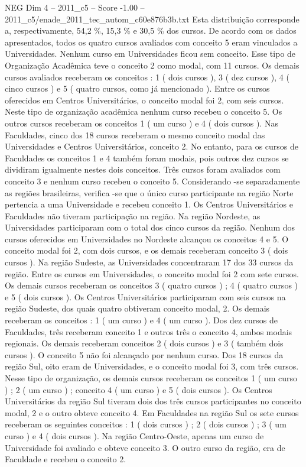 \begin{textsample}{NEG Dim 4 – 2011\_c5 – Score -1.00 – 2011\_c5/enade\_2011\_tec\_autom\_c60e876b3b.txt}
Esta distribuição corresponde a, respectivamente, 54,2 \%, 15,3 \% e 30,5 \% dos cursos.
De acordo com os dados apresentados, todos os quatro cursos avaliados com conceito 5 eram vinculados a Universidades.
Nenhum curso em Universidades ficou sem conceito.
Esse tipo de Organização Acadêmica teve o conceito 2 como modal, com 11 cursos.
Os demais cursos avaliados receberam os conceitos : 1 ( dois cursos ), 3 ( dez cursos ), 4 ( cinco cursos ) e 5 ( quatro cursos, como já mencionado ).
Entre os cursos oferecidos em Centros Universitários, o conceito modal foi 2, com seis cursos.
Neste tipo de organização acadêmica nenhum curso recebeu o conceito 5.
Os outros cursos receberam os conceitos 1 ( um curso ) e 4 ( dois cursos ).
Nas Faculdades, cinco dos 18 cursos receberam o mesmo conceito modal das Universidades e Centros Universitários, conceito 2.
No entanto, para os cursos de Faculdades os conceitos 1 e 4 também foram modais, pois outros dez cursos se dividiram igualmente nestes dois conceitos.
Três cursos foram avaliados com conceito 3 e nenhum curso recebeu o conceito 5.
Considerando -se separadamente as regiões brasileiras, verifica -se que o único curso participante na região Norte pertencia a uma Universidade e recebeu conceito 1.
Os Centros Universitários e Faculdades não tiveram participação na região.
Na região Nordeste, as Universidades participaram com o total dos cinco cursos da região.
Nenhum dos cursos oferecidos em Universidades no Nordeste alcançou os conceitos 4 e 5.
O conceito modal foi 2, com dois cursos, e os demais receberam conceito 3 ( dois cursos ).
Na região Sudeste, as Universidades concentraram 17 dos 33 cursos da região.
Entre os cursos em Universidades, o conceito modal foi 2 com sete cursos.
Os demais cursos receberam os conceitos 3 ( quatro cursos ) ; 4 ( quatro cursos ) e 5 ( dois cursos ).
Os Centros Universitários participaram com seis cursos na região Sudeste, dos quais quatro obtiveram conceito modal, 2.
Os demais receberam os conceitos : 1 ( um curso ) e 4 ( um curso ).
Dos dez cursos de Faculdades, três receberam conceito 1 e outros três o conceito 4, ambos modais regionais.
Os demais receberam conceitos 2 ( dois cursos ) e 3 ( também dois cursos ).
O conceito 5 não foi alcançado por nenhum curso.
Dos 18 cursos da região Sul, oito eram de Universidades, e o conceito modal foi 3, com três cursos.
Nesse tipo de organização, os demais cursos receberam os conceitos 1 ( um curso ) ; 2 ( um curso ) ; conceito 4 ( um curso ) e 5 ( dois cursos ).
Os Centros Universitários da região Sul tiveram dois dos três cursos participantes no conceito modal, 2 e o outro obteve conceito 4.
Em Faculdades na região Sul os sete cursos receberam os seguintes conceitos : 1 ( dois cursos ) ; 2 ( dois cursos ) ; 3 ( um curso ) e 4 ( dois cursos ).
Na região Centro-Oeste, apenas um curso de Universidade foi avaliado e obteve conceito 3.
O outro curso da região, era de Faculdade e recebeu o conceito 2.

\end{textsample}

